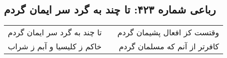 \begin{center}
\section*{رباعی شماره ۴۲۳: تا چند به گرد سر ایمان گردم}
\label{sec:sh423}
\begin{longtable}{l p{0.5cm} r}
تا چند به گرد سر ایمان گردم
&&
وقتست کز افعال پشیمان گردم
\\
خاکم ز کلیسیا و آبم ز شراب
&&
کافرتر از آنم که مسلمان گردم
\\
\end{longtable}
\end{center}
